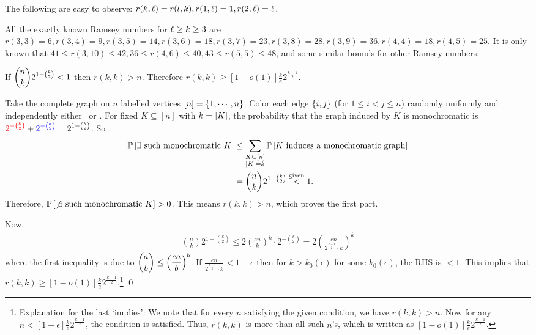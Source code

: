 \begin{rmk}
The following are easy to observe: $r(k,\ell)=r(l,k), r(1,\ell)=1, r(2,\ell)=\ell$.
\end{rmk}

All the exactly known Ramsey numbers for $\ell\geq k\geq 3$ are
$r(3,3)=6, r(3,4)=9, r(3,5)=14, r(3,6)=18, r(3,7)=23, r(3,8)=28, r(3,9)=36, r(4,4)=18, r(4,5)=25$. It is only known that $41\leq r(3,10)\leq 42, 36\leq r(4,6)\leq 40, 43\leq r(5,5)\leq 48$, and some similar bounds for other Ramsey numbers.

\begin{thm}[Erdos '47]
If $\displaystyle\binom n k 2^{1-\binom k 2} < 1$ then $r(k,k)>n$. Therefore $r(k,k)\geq \left[1-o(1)\right]\frac{k}{e} 2^{\frac{k-1}2}$.
\end{thm}
\begin{pf}
Take the complete graph on $n$ labelled vertices $[n] = \left\{1,\cdots,n\right\}$. Color each edge $\left\{i,j\right\}$ (for $1\leq i<j\leq n$) randomly uniformly and independently either \red~or \blue. For fixed $K\subseteq[n]$ with $k=\left| K \right|$, the probability that the graph induced by $K$ is monochromatic is $\displaystyle{\color{red}2^{-\binom k 2}} + {\color{blue}2^{-\binom k 2}} = 2^{1-\binom k 2}$. So 
\begin{align*}
\displaystyle\mathbb P\left[ \exists \text{ such monochromatic }K \right] &\leq \sum_{\substack{K\subseteq [n]\\ \left| K \right| = k}} \mathbb P\left[ K \text{ induces a monochromatic graph} \right] \\
&= \binom n k 2^{1-\binom k 2} \stackrel{\text{given}}{<} 1.
\end{align*}
Therefore, $\displaystyle\mathbb P\left[ \not\exists \text{ such monochromatic }K \right] >0$. This means $r(k,k)>n$, which proves the first part.

Now, \begin{align*}
\binom n k 2^{1-\binom k 2} \leq 2 \left(\frac{en}{k}\right)^k\cdot 2^{-\binom k2} = 2\left(\frac{en}{2^{ \frac{k-1}{2}}\cdot k }\right)^k
\end{align*}
where the first inequality is due to $\displaystyle\binom a b \leq \left(\frac{ea}{b}\right)^b$. If $\frac{en}{2^{ \frac{k-1}{2}}\cdot k }<1-\epsilon$ then for $k>k_0(\epsilon)$ for some $k_0(\epsilon)$, the RHS is $<1$. This implies that $r(k,k) \geq \left[1-o(1)\right]\frac{k}{e} 2^{\frac{k-1}2}$.\footnote{
Explanation for the last `implies': We note that for every $n$ satisfying the given condition, we have $r(k,k)>n$. Now for any $n<\left[1-\epsilon\right]\frac{k}{e} 2^{\frac{k-1}2}$, the condition is satisfied. Thus, $r(k,k)$ is more than all such $n$'s, which is written as $\left[1-o(1)\right]\frac{k}{e} 2^{\frac{k-1}2}$.
}
\qed\end{pf}

